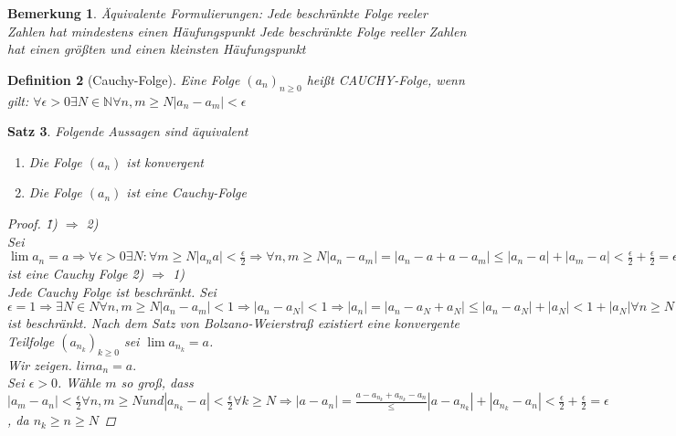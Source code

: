 \documentclass[a4paper,titlepage,oneside]{article}
\def\N{\ensuremath{\mathbb{N}} }
\newcommand{\abs}[1]{\ensuremath{\left|#1\right|}}
\theoremstyle{thmstyle}
\newtheorem{satz}{Satz}[subsection]
\newtheorem{defi}[satz]{Definition}
\newtheorem{bem}[satz]{Bemerkung}
\begin{document}
\begin{bem}
Äquivalente Formulierungen:
Jede beschränkte Folge reeler Zahlen hat mindestens einen Häufungspunkt
Jede beschränkte Folge reeller Zahlen hat einen größten und einen kleinsten Häufungspunkt
\end{bem}

\begin{defi}[Cauchy-Folge] 
Eine Folge $(a_n)_{n \ge 0}$ heißt CAUCHY-Folge, wenn gilt:
$\forall \epsilon > 0 \exists N \in \N \forall n, m \ge N \abs{a_n - a_m} < \epsilon$
\end{defi}

\begin{satz}
Folgende Aussagen sind äquivalent
\begin{enumerate}
\item Die Folge $(a_n)$ ist konvergent
\item Die Folge $(a_n)$ ist eine Cauchy-Folge
\end{enumerate}
\begin{proof}
\"1) $\Rightarrow$ 2)\"\\
Sei $\lim{a_n} = a \Rightarrow \forall \epsilon > 0 \exists N : \forall m \ge N \abs{a_n a} < \frac{\epsilon}{2} \Rightarrow \forall n, m \ge N
\abs{a_n - a_m} = \abs{a_n - a + a - a_m} \le \abs{a_n - a }  + \abs{a_m - a} <  \frac{\epsilon}{2}+ \frac{\epsilon}{2} = \epsilon
\Rightarrow a_n$ ist eine Cauchy Folge
\"2) $\Rightarrow$ 1)\"\\
Jede Cauchy Folge ist beschränkt. Sei $\epsilon = 1 \Rightarrow \exists N \in N \forall n, m \ge N \abs{a_n - a_m} < 1 \Rightarrow \abs{a_n - a_N} < 1 \Rightarrow \abs{a_n} = \abs{a_n - a_N + a_N} \le \abs{a_n - a_N} + \abs{a_N} < 1 + \abs{a_N} \forall n  \ge N
\Rightarrow \forall n \in \N \abs{a_n} \le max\{\abs{a_0},...,\abs{a_{N-1}},\abs{a _N} + 1\} \Rightarrow (a_n)$ ist beschränkt.
Nach dem Satz von Bolzano-Weierstraß existiert eine konvergente Teilfolge $(a_{n_k})_{k \ge 0}$ sei $\lim{a_{n_k}} = a$.\\
Wir zeigen. $lim{a_n} = a.$\\
Sei $\epsilon > 0$. Wähle $m$ so groß, dass $\abs{a_m - a_n} < \frac{\epsilon}{2} \forall n,m \ge N und \abs{a_{n_k} - a} < \frac{\epsilon}{2} \forall k \ge N \Rightarrow \abs{a-a_n} = \frac{a - a_{n_k} + a_{n_k} - a_n} \le \abs{a- a_{n_k}} + \abs{a_{n_k} - a_n} < \frac{\epsilon}{2} + \frac{\epsilon}{2} = \epsilon$, da $n_k \ge n \ge N$
\end{proof}
\end{satz}
\end{document}
